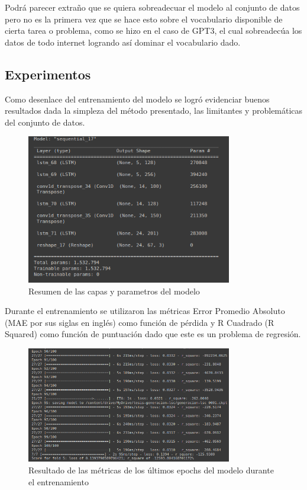 Podrá parecer extraño que se quiera sobreadecuar el modelo al conjunto de datos pero no es la primera vez que se hace esto sobre el vocabulario disponible de cierta tarea o problema, como se hizo en el caso de GPT3, el cual sobreadecúa los datos de todo internet logrando así dominar el vocabulario dado.

\subsection{Experimentos}
Como desenlace del entrenamiento del modelo se logró evidenciar buenos resultados dada la simpleza del método presentado, las limitantes y problemáticas del conjunto de datos.

\begin{figure}[ht!]
    \centering
    \includegraphics[width=0.8\textwidth]{Graphics/resumen_modelo.png}
    \caption{Resumen de las capas y parametros del modelo}
    \label{fig:resumen_modelo}
\end{figure}

Durante el entrenamiento se utilizaron las métricas Error Promedio Absoluto (MAE por sus siglas en inglés) como función de pérdida y R Cuadrado (R Squared) como función de puntuación dado que este es un problema de regresión.


\begin{figure}[ht!]
    \centering
    \includegraphics[width=0.8\textwidth]{Graphics/metricas_last_epochs.png}
    \caption{Resultado de las métricas de los últimos epochs del modelo durante el entrenamiento}
    \label{fig:metricas_last_epochs}
\end{figure}

